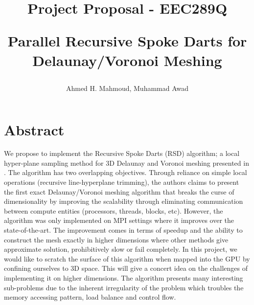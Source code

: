 \documentclass[12pt] {article}
\begin{document}

\title{
Project Proposal -  EEC289Q \\
\begin{large}
Parallel Recursive Spoke Darts for Delaunay/Voronoi Meshing
\end{large}
}
\author{Ahmed H. Mahmoud, Muhammad Awad}
\date{}
\maketitle



\section*{Abstract}
We propose to implement the Recursive Spoke Darts (RSD) algorithm; a local hyper-plane sampling method for 3D Delaunay and Voronoi meshing presented in \citep{EBEIDA2016110}. The algorithm has two overlapping objectives. Through reliance on simple local operations (recursive line-hyperplane trimming), the authors claims to present the first exact Delaunay/Voronoi meshing algorithm that breaks the curse of dimensionality by improving the scalability through eliminating communication between compute entities (processors, threads, blocks, etc). However, the algorithm was only implemented on MPI settings where it improves over the state-of-the-art. The improvement comes in terms of speedup and the ability to construct the mesh exactly in higher dimensions where other methods give approximate solution, prohibitively slow or fail completely. In this project, we would like to scratch the surface of this algorithm when mapped into the GPU by confining ourselves to 3D space. This will give a concert idea on the challenges of implementing it on higher dimensions. The algorithm presents many interesting sub-problems due to the inherent irregularity of the problem which troubles the memory accessing pattern, load balance and control flow. 
\end{document}
